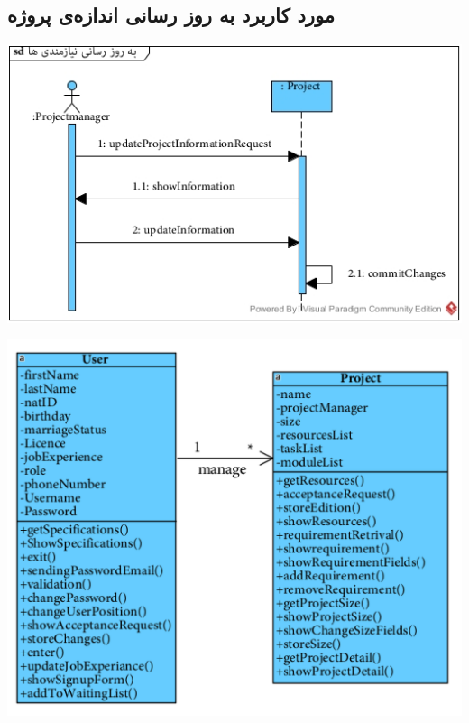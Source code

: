 \subsection*{مورد کاربرد به روز رسانی اندازه‌ی پروژه}
\vspace{2cm}
\begin{center}
\includegraphics[width=\textwidth]{SequenceDiagrams/26.jpg}
\end{center}

\newpage
\vspace{2cm}
\begin{center}
\includegraphics[width=\textwidth]{SequenceClasses/26.png}
\end{center}

\newpage
\vspace{2cm}
